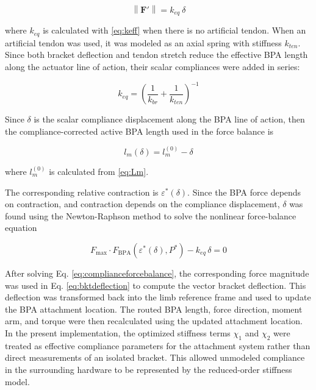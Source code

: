 \begin{equation} \left\| \mathbf{F}' \right\| = k_{eq} \: \delta
\label{eq:hookereduced}
\end{equation}

where $k_{eq}$ is calculated with \eqref{eq:keff} when there is no artificial tendon. When an artificial tendon was used, it was modeled as an axial spring with stiffness $k_{ten}$. Since both bracket deflection and tendon stretch reduce the effective BPA length along the actuator line of action, their scalar compliances were added in series:

\begin{equation} k_{eq} = \left( \frac{1}{k_{br}} + \frac{1}{k_{ten}} \right)^{-1}
\label{eq:equivalentstiffness}
\end{equation}

Since $\delta$ is the scalar compliance displacement along the BPA line of action, then the compliance-corrected active BPA length used in the force balance is

\begin{equation} l_m(\delta) = l_m^{(0)} - \delta
\label{eq:activelengthcorrected}
\end{equation}

where $l_m^{(0)}$ is calculated from \eqref{eq:Lm}.

The corresponding relative contraction is $\varepsilon^*(\delta)$. Since the BPA force depends on contraction, and contraction depends on the compliance displacement, $\delta$ was found using the Newton-Raphson method to solve the nonlinear force-balance equation

\begin{equation} F_{\mathrm{max}} \cdot F_{\mathrm{BPA}}\!\left(\varepsilon^*(\delta),P^*\right) - k_{eq}\,\delta = 0
\label{eq:complianceforcebalance}
\end{equation}

After solving Eq. \ref{eq:complianceforcebalance}, the corresponding force magnitude was used in Eq. \ref{eq:bktdeflection} to compute the vector bracket deflection. This deflection was transformed back into the limb reference frame and used to update the BPA attachment location. The routed BPA length, force direction, moment arm, and torque were then recalculated using the updated attachment location. In the present implementation, the optimized stiffness terms $\chi_{1}$ and $\chi_{2}$ were treated as effective compliance parameters for the attachment system rather than direct measurements of an isolated bracket. This allowed unmodeled compliance in the surrounding hardware to be represented by the reduced-order stiffness model.



